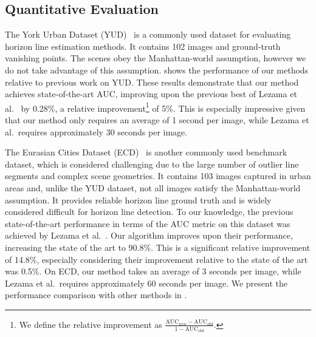 \subsection{Quantitative Evaluation}


The York Urban Dataset (YUD)~\cite{edgebased2008} is a commonly used dataset
for evaluating horizon line estimation methods. It contains 102 images
and ground-truth vanishing points. The scenes obey the Manhattan-world
assumption, however we do not take advantage of this assumption.
 shows the performance of our methods relative to
previous work on YUD. These results demonstrate that our method
achieves state-of-the-art AUC, improving upon the previous best of
Lezama et al.~\cite{alignment2014} by 0.28\%, a relative
improvement\footnote{We define the relative improvement as
$\frac{\text{AUC}_{new} - \text{AUC}_{old}}{1 - \text{AUC}_{old}}$.} of
5\%. This is especially impressive given that our method only requires
an average of 1 second per image, while Lezama et al.\ requires
approximately 30 seconds per image.


The Eurasian Cities Dataset (ECD)~\cite{geoparser2010} is another
commonly used benchmark dataset, which is considered challenging due
to the large number of outlier line segments and complex scene
geometries. It contains 103 images captured in urban areas and, unlike
the YUD dataset, not all images satisfy the Manhattan-world
assumption. It provides reliable horizon line ground truth and is
widely considered difficult for horizon line detection. To our
knowledge, the previous state-of-the-art performance in terms of the
AUC metric on this dataset was achieved by Lezama et
al.~\cite{alignment2014}. Our algorithm improves upon their
performance, increasing the state of the art to 90.8\%.  This is a
significant relative improvement of 14.8\%, especially considering
their improvement relative to the state of the art was 0.5\%.  On ECD,
our method takes an average of 3 seconds per image, while Lezama et
al.\ requires approximately 60 seconds per image. We present the
performance comparison with other methods in .

